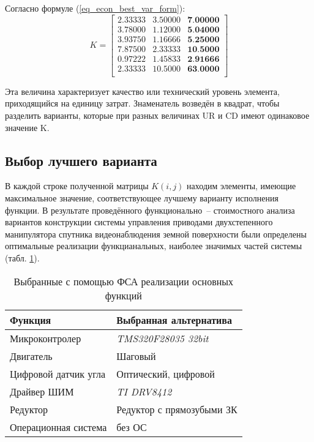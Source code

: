 Согласно формуле (\ref{eq_econ_best_var_form}):
\begin{equation}
    K =
        \begin{bmatrix}
            2.33333 & 3.50000 & \textbf{7.00000} \\
            3.78000 & 1.12000 & \textbf{5.04000} \\
            3.93750 & 1.16666 & \textbf{5.25000} \\
            7.87500 & 2.33333 & \textbf{10.5000} \\
            0.97222 & 1.45833 & \textbf{2.91666} \\
            2.33333 & 10.5000 & \textbf{63.0000} \\
        \end{bmatrix}
    \label{eq_econ_best_var}
\end{equation}

Эта величина характеризует качество или технический уровень
элемента, приходящийся на единицу затрат. Знаменатель возведён в квадрат,
чтобы разделить варианты, которые при разных величинах UR и CD имеют
одинаковое значение K.

\newpage
\subsection{Выбор лучшего варианта}
В каждой строке полученной матрицы $K(i, j)$ находим элементы,
имеющие максимальное значение, соответствующее лучшему варианту
исполнения функции.
В результате проведённого функционально~-- стоимостного анализа
вариантов конструкции системы управления приводами двухстепенного манипулятора
спутника видеонаблюдения земной поверхности были определены оптимальные
реализации функцианальных, наиболее значимых частей системы
(табл. \ref{tbl_econ_result}).

\begin{table}[ht]
    \centering
    \begin{tabular}{|l|l|}
        \hline
        Функция & Выбранная альтернатива \\
        \hline
        \hline
        Микроконтролер & \textit{TMS320F28035 32bit} \\
        \hline
        Двигатель & Шаговый \\
        \hline
        Цифровой датчик угла & Оптический, цифровой \\
        \hline
        Драйвер ШИМ & \textit{TI DRV8412} \\
        \hline
        Редуктор & Редуктор с прямозубыми ЗК \\
        \hline
        Операционная система & без ОС \\
        \hline
    \end{tabular}
    \caption{Выбранные с помощью ФСА реализации основных функций}
    \label{tbl_econ_result}
\end{table}

